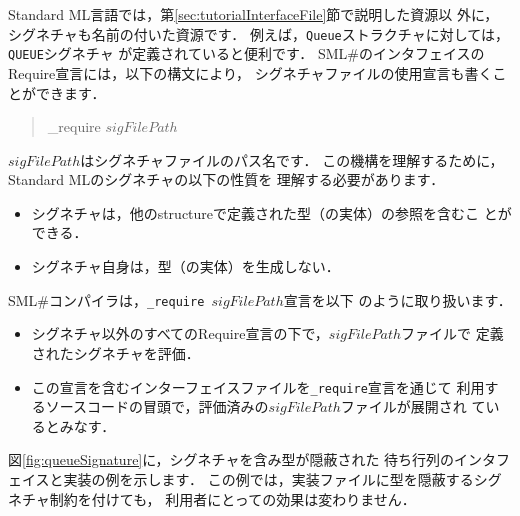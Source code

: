 \documentclass{jbook}
\newif\ifjp
\newcommand{\smlsharp}{SML\#}
\newenvironment{program}{\begin{quote}\begin{tt}}%
                        {\end{tt}\end{quote}}
\begin{document}
\ifjp%
	Standard ML言語では，第\ref{sec:tutorialInterfaceFile}節で説明した資源以
外に，シグネチャも名前の付いた資源です．
	例えば，{\tt Queue}ストラクチャに対しては，{\tt QUEUE}シグネチャ
が定義されていると便利です．
	\smlsharp{}のインタフェイスのRequire宣言には，以下の構文により，
シグネチャファイルの使用宣言も書くことができます．
\begin{program}
\_require $sigFilePath$
\end{program}
	$sigFilePath$はシグネチャファイルのパス名です．
	この機構を理解するために，Standard MLのシグネチャの以下の性質を
理解する必要があります．
\begin{itemize}
\item シグネチャは，他のstructureで定義された型（の実体）の参照を含むこ
とができる．
\item シグネチャ自身は，型（の実体）を生成しない．
\end{itemize}
	\smlsharp{}コンパイラは，{\tt \_require $sigFilePath$}宣言を以下
のように取り扱います．
\begin{itemize}
\item シグネチャ以外のすべてのRequire宣言の下で，$sigFilePath$ファイルで
定義されたシグネチャを評価．
\item この宣言を含むインターフェイスファイルを{\tt \_require}宣言を通じて
利用するソースコードの冒頭で，評価済みの$sigFilePath$ファイルが展開され
ているとみなす．
\end{itemize}
	図\ref{fig:queueSignature}に，シグネチャを含み型が隠蔽された
待ち行列のインタフェイスと実装の例を示します．
	この例では，実装ファイルに型を隠蔽するシグネチャ制約を付けても，
利用者にとっての効果は変わりません．
\end{document}
